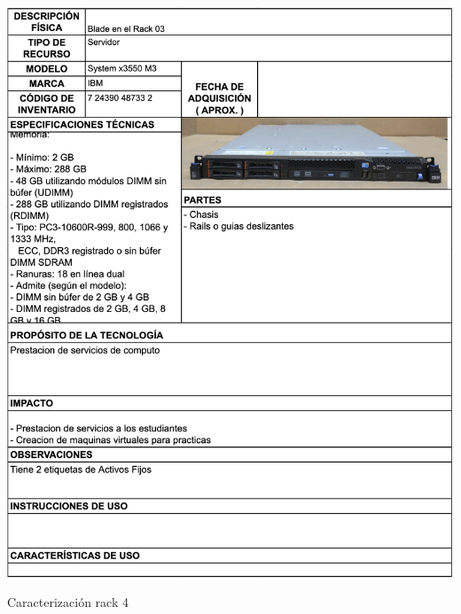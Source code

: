 \begin{table}[H]
    \centering
    \includegraphics[width=\textwidth]{tablas-images/cp1/racks/rack-4.png}
    \caption{Caracterización rack 4}\label{tab:rack-4}
\end{table}

